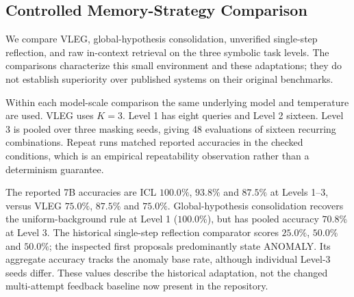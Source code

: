\documentclass[onecolumn]{IEEEtran}
\numberwithin{equation}{section}
\theoremstyle{definition}
\theoremstyle{remark}
\begin{document}
\subsection{Controlled Memory-Strategy Comparison}
\label{sec:exp1}

We compare VLEG, global-hypothesis consolidation, unverified single-step reflection, and raw in-context retrieval on the three symbolic task levels. The comparisons characterize this small environment and these adaptations; they do not establish superiority over published systems on their original benchmarks.

Within each model-scale comparison the same underlying model and temperature are used. VLEG uses $K=3$. Level 1 has eight queries and Level 2 sixteen. Level 3 is pooled over three masking seeds, giving 48 evaluations of sixteen recurring combinations. Repeat runs matched reported accuracies in the checked conditions, which is an empirical repeatability observation rather than a determinism guarantee.

The reported 7B accuracies are ICL $100.0\%$, $93.8\%$ and $87.5\%$ at Levels 1--3, versus VLEG $75.0\%$, $87.5\%$ and $75.0\%$. Global-hypothesis consolidation recovers the uniform-background rule at Level 1 ($100.0\%$), but has pooled accuracy $70.8\%$ at Level 3. The historical single-step reflection comparator scores $25.0\%$, $50.0\%$ and $50.0\%$; the inspected first proposals predominantly state ANOMALY. Its aggregate accuracy tracks the anomaly base rate, although individual Level-3 seeds differ. These values describe the historical adaptation, not the changed multi-attempt feedback baseline now present in the repository.
\end{document}
